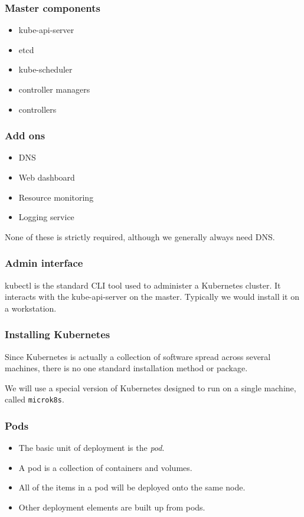 \documentclass[10pt]{beamer}
\begin{document}
\begin{frame}
  \frametitle{Master components}
  
  \begin{itemize}
    \item kube-api-server
    \item etcd
    \item kube-scheduler
    \item controller managers
    \item controllers
  \end{itemize}
  
\end{frame}

\begin{frame}
  \frametitle{Add ons}
  
  \begin{itemize}
    \item DNS
    \item Web dashboard
    \item Resource monitoring
    \item Logging service
  \end{itemize}
  
  None of these is strictly required, although we generally always need DNS.
\end{frame}

\begin{frame}
  \frametitle{Admin interface}
  
  kubectl is the standard CLI tool used to administer a Kubernetes cluster. It interacts with the kube-api-server on the master. Typically we would install it on a workstation.
  
\end{frame}

\begin{frame}
  \frametitle{Installing Kubernetes}
  
  Since Kubernetes is actually a collection of software spread across several machines, there is no one standard installation method or package.
  
  We will use a special version of Kubernetes designed to run on a single machine, called \texttt{microk8s}.
  
\end{frame}

\begin{frame}
  \frametitle{Pods}
  
  \begin{itemize}
    \item The basic unit of deployment is the \emph{pod}.
    \item A pod is a collection of containers and volumes.
    \item All of the items in a pod will be deployed onto the same node.
    \item Other deployment elements are built up from pods.
  \end{itemize}
\end{frame}
\end{document}
